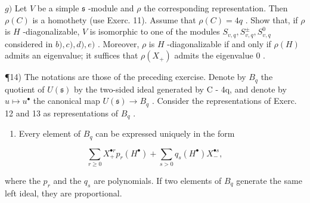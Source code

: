 \(g)\) Let \(V\) be a simple \(\mathfrak{s}\) -module and \(\rho\) the corresponding representation. Then \(\rho(C)\) is a homothety (use Exerc. 11). Assume that \(\rho(C) = 4q\) . Show that, if \(\rho\) is \(H\) -diagonalizable, \(V\) is isomorphic to one of the modules \(S_{v,q}, S_{v,q}^{\pm}, S_{v,q}^{0}\) considered in \(b), c), d), e)\) . Moreover, \(\rho\) is \(H\) -diagonalizable if and only if \(\rho(H)\) admits an eigenvalue; it suffices that \(\rho(X_{+})\) admits the eigenvalue \(0\) .

¶14) The notations are those of the preceding exercise. Denote by \(B_{q}\) the quotient of \(U(\mathfrak{s})\) by the two-sided ideal generated by C - 4q, and denote by \(u \mapsto u^{\bullet}\) the canonical map \(U(\mathfrak{s}) \to B_{q}\) . Consider the representations of Exerc. 12 and 13 as representations of \(B_{q}\) .

\begin{enumerate}
\def\labelenumi{\alph{enumi})}
\tightlist
\item
  Every element of \(B_{q}\) can be expressed uniquely in the form
\end{enumerate}

\[
\sum_ {r \geq 0} X _ {+} ^ {\bullet r} p _ {r} (H ^ {\bullet}) + \sum_ {s > 0} q _ {s} (H ^ {\bullet}) X _ {-} ^ {\bullet s},
\]

where the \(p_{r}\) and the \(q_{s}\) are polynomials. If two elements of \(B_{q}\) generate the same left ideal, they are proportional.

